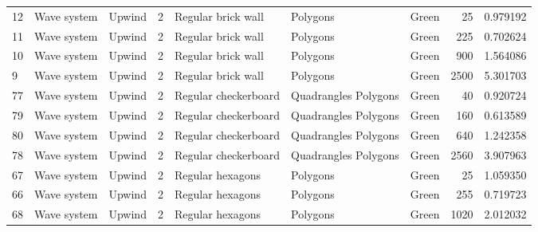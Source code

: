 \begin{tabular}{lllrlllrr}
12 &  Wave system &                            Upwind &               2 &              Regular brick wall &              Polygons  &      Green &                       25 &                         0.979192 \\
11 &  Wave system &                            Upwind &               2 &              Regular brick wall &              Polygons  &      Green &                      225 &                         0.702624 \\
10 &  Wave system &                            Upwind &               2 &              Regular brick wall &              Polygons  &      Green &                      900 &                         1.564086 \\
9  &  Wave system &                            Upwind &               2 &              Regular brick wall &              Polygons  &      Green &                     2500 &                         5.301703 \\
77 &  Wave system &                            Upwind &               2 &            Regular checkerboard &  Quadrangles Polygons  &      Green &                       40 &                         0.920724 \\
79 &  Wave system &                            Upwind &               2 &            Regular checkerboard &  Quadrangles Polygons  &      Green &                      160 &                         0.613589 \\
80 &  Wave system &                            Upwind &               2 &            Regular checkerboard &  Quadrangles Polygons  &      Green &                      640 &                         1.242358 \\
78 &  Wave system &                            Upwind &               2 &            Regular checkerboard &  Quadrangles Polygons  &      Green &                     2560 &                         3.907963 \\
67 &  Wave system &                            Upwind &               2 &                Regular hexagons &              Polygons  &      Green &                       25 &                         1.059350 \\
66 &  Wave system &                            Upwind &               2 &                Regular hexagons &              Polygons  &      Green &                      255 &                         0.719723 \\
68 &  Wave system &                            Upwind &               2 &                Regular hexagons &              Polygons  &      Green &                     1020 &                         2.012032 \\

\end{tabular}
